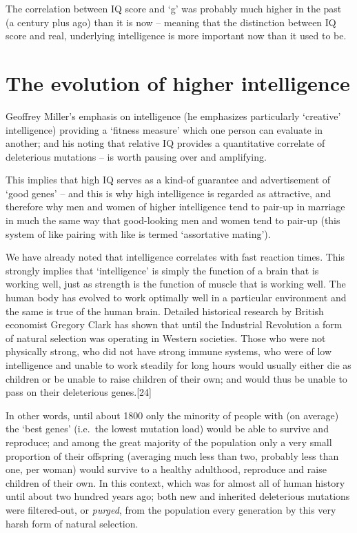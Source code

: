 \documentclass[
]{book}
\begin{document}
The correlation between IQ score and `g' was probably much higher in the past (a century plus ago) than it is now -- meaning that the distinction between IQ score and real, underlying intelligence is more important now than it used to be.

\hypertarget{the-evolution-of-higher-intelligence}{%
\section{The evolution of higher intelligence}\label{the-evolution-of-higher-intelligence}}

Geoffrey Miller's emphasis on intelligence (he emphasizes particularly `creative' intelligence) providing a `fitness measure' which one person can evaluate in another; and his noting that relative IQ provides a quantitative correlate of deleterious mutations -- is worth pausing over and amplifying.

This implies that high IQ serves as a kind-of guarantee and advertisement of `good genes' -- and this is why high intelligence is regarded as attractive, and therefore why men and women of higher intelligence tend to pair-up in marriage in much the same way that good-looking men and women tend to pair-up (this system of like pairing with like is termed `assortative mating').

We have already noted that intelligence correlates with fast reaction times. This strongly implies that `intelligence' is simply the function of a brain that is working well, just as strength is the function of muscle that is working well. The human body has evolved to work optimally well in a particular environment and the same is true of the human brain. Detailed historical research by British economist Gregory Clark has shown that until the Industrial Revolution a form of natural selection was operating in Western societies. Those who were not physically strong, who did not have strong immune systems, who were of low intelligence and unable to work steadily for long hours would usually either die as children or be unable to raise children of their own; and would thus be unable to pass on their deleterious genes.{[}24{]}

In other words, until about 1800 only the minority of people with (on average) the `best genes' (i.e.~the lowest mutation load) would be able to survive and reproduce; and among the great majority of the population only a very small proportion of their offspring (averaging much less than two, probably less than one, per woman) would survive to a healthy adulthood, reproduce and raise children of their own. In this context, which was for almost all of human history until about two hundred years ago; both new and inherited deleterious mutations were filtered-out, or \emph{purged}, from the population every generation by this very harsh form of natural selection.
\end{document}
